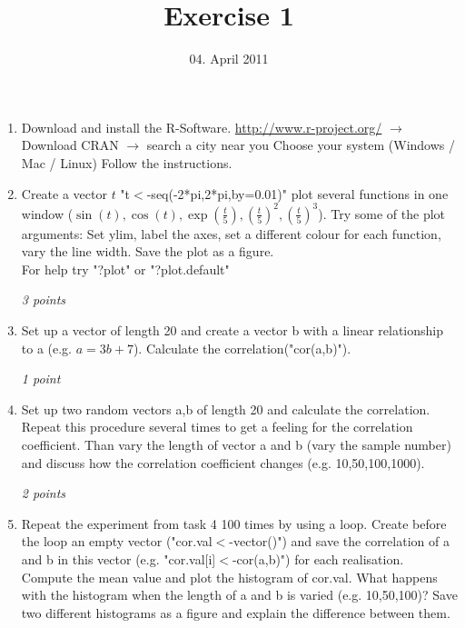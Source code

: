 \documentclass[a4paper,12pt]{article}
\title{Exercise 1}
\date{04. April 2011}
\begin{document}
\maketitle
\thispagestyle{fancy}

\begin{enumerate}

\item Download and install the R-Software.
\url{http://www.r-project.org/}  $\rightarrow$ Download CRAN $\rightarrow$ search a city near you
Choose your system (Windows / Mac / Linux)
Follow the instructions.
\\[1ex]

\item Create a vector $t$  "t$<$-seq(-2*pi,2*pi,by=0.01)"
plot several functions in one window ($\sin(t), \cos(t), \exp(\frac t 5), (\frac t 5)^2, (\frac t 5)^3$). Try some of the plot arguments: Set ylim, label the axes, set a different colour for each function, vary the line width. Save the plot as a figure. \\
For help try "?plot" or "?plot.default"

\textit{ 3 points} \\[2ex]

\item Set up a vector of length 20 and create a vector b with a linear relationship to a (e.g. $a=3b+7$).
Calculate the correlation("cor(a,b)").

\textit{ 1 point} \\[2ex]

\item Set up two random vectors a,b of length 20 and calculate the correlation. Repeat this procedure several times to get a feeling for the correlation coefficient.
Than vary the length of vector a and b (vary the sample number) and discuss how the correlation coefficient changes (e.g. 10,50,100,1000). 

\textit{ 2 points} \\[2ex]

\item Repeat the experiment from task 4 100 times by using a loop.
Create before the loop an empty vector ("cor.val$<$-vector()") and save the correlation of a and b in this vector (e.g. "cor.val[i]$<$-cor(a,b)") for each realisation.
Compute the mean value and plot the histogram of cor.val. 
What happens with the histogram when the length of a and b is varied (e.g. 10,50,100)? Save two different histograms as a figure and explain the difference between them. 


\end{enumerate}
\end{document}
